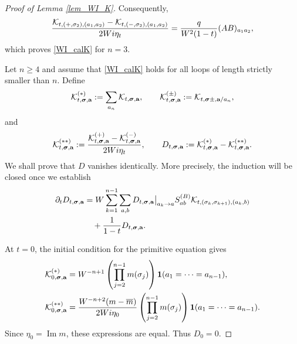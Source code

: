 \documentclass[10pt,reqno]{article}
\DeclareMathOperator{\im}{{\mathrm{Im}}}
\renewcommand{\bar}{\overline}
\theoremstyle{plain} %
\theoremstyle{remark}
\numberwithin{equation}{section}
\begin{document}
\begin{proof}[Proof of Lemma \ref{lem_WI_K}]
\noindent Consequently,
\[
 \frac{
 {\cal K}_{t,(+,\sigma_2),(a_1,a_2)}
 -{\cal K}_{t,(-,\sigma_2),(a_1,a_2)}
 }{2Wi\eta_t}
 =\frac{q}{W^2(1-t)}(AB)_{a_1a_2},
\]
which proves \eqref{WI_calK} for $n=3$.

\medskip
{}

Let $n\geq4$ and assume that \eqref{WI_calK} holds for all loops of length
strictly smaller than $n$. Define
\begin{equation}\label{def_calKpm}
 {\cal K}^{(*)}_{t,\boldsymbol{\sigma},\textbf{a}}
 :=\sum_{a_n}{\cal K}_{t,\boldsymbol{\sigma},\textbf{a}},
 \qquad
 {\cal K}^{(\pm)}_{t,\boldsymbol{\sigma},\textbf{a}}
 :={\cal K}_{t,\boldsymbol{\sigma}\pm,\textbf{a}/a_n},
\end{equation}
and
\[
 {\cal K}^{(**)}_{t,\boldsymbol{\sigma},\textbf{a}}
 :=\frac{{\cal K}^{(+)}_{t,\boldsymbol{\sigma},\textbf{a}}
 -{\cal K}^{(-)}_{t,\boldsymbol{\sigma},\textbf{a}}}{2Wi\eta_t},
 \qquad
 D_{t,\boldsymbol{\sigma},\textbf{a}}:={\cal K}^{(*)}_{t,\boldsymbol{\sigma},\textbf{a}}
 -{\cal K}^{(**)}_{t,\boldsymbol{\sigma},\textbf{a}}.
\]
We shall prove that $D$ vanishes identically. More precisely, the induction
will be closed once we establish
\begin{equation}\label{finK*-K}
\begin{aligned}
 \partial_tD_{t,\boldsymbol{\sigma},\textbf{a}}
 &=W\sum_{k=1}^{n-1}\sum_{a,b}
 D_{t,\boldsymbol{\sigma},\textbf{a}}\big|_{a_k\to a}
 S^{(B)}_{ab}{\cal K}_{t,(\sigma_k,\sigma_{k+1}),(a_k,b)}\\
 &\quad+\frac{1}{1-t}D_{t,\boldsymbol{\sigma},\textbf{a}}.
\end{aligned}
\end{equation}

At $t=0$, the initial condition for the primitive equation gives
\begin{align*}
 {\cal K}^{(*)}_{0,\boldsymbol{\sigma},\textbf{a}}
 &=W^{-n+1}
 \left(\prod_{j=2}^{n-1}m(\sigma_j)\right)
 \mathbf 1(a_1=\cdots=a_{n-1}),                                    \\
 {\cal K}^{(**)}_{0,\boldsymbol{\sigma},\textbf{a}}
 &=\frac{W^{-n+2}(m-\bar m)}{2Wi\eta_0}
 \left(\prod_{j=2}^{n-1}m(\sigma_j)\right)
 \mathbf 1(a_1=\cdots=a_{n-1}).
\end{align*}
Since $\eta_0=\im m$, these expressions are equal. Thus $D_0=0$.


\end{proof}
\end{document}
